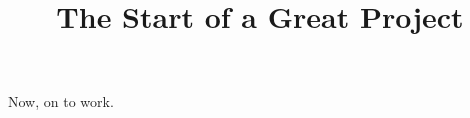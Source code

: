 \documentclass{article}
\title{The Start of a Great Project}
\date{}
\begin{document}
\maketitle

Now, on to work.
\end{document}
